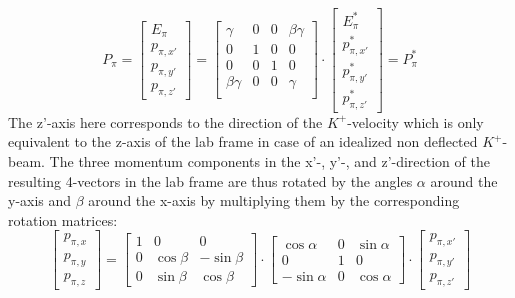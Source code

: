 \documentclass[a4paper,parskip,11pt, DIV12]{scrreprt}
\begin{document}
	\begin{equation}
		P_{\pi} = 
		\begin{bmatrix}
			E_{\pi} \\ p_{\pi,x'} \\ p_{\pi,y'} \\ p_{\pi,z'}
		\end{bmatrix}
		=
		\begin{bmatrix}
			\gamma & 0 & 0 & \beta \gamma \\
			0 & 1 & 0 & 0 \\
			0 & 0 & 1 & 0\\
			\beta \gamma & 0 & 0 & \gamma \\
		\end{bmatrix}
		\cdot
		\begin{bmatrix}
			E_{\pi}^* \\ p_{\pi,x'}^* \\ p_{\pi,y'}^* \\ p_{\pi,z'}^*
		\end{bmatrix} = P^*_{\pi}
	\end{equation}
	The z'-axis here corresponds to the direction of the $K^+$-velocity which is only equivalent to the z-axis of the lab frame in case of an idealized non deflected $K^+$-beam. The three momentum components in the x'-, y'-, and z'-direction of the resulting 4-vectors in the lab frame are thus rotated by the angles $\alpha$ around the y-axis and $\beta$ around the x-axis by multiplying them by the corresponding rotation matrices:
	\begin{equation}
		\begin{bmatrix}
			p_{\pi,x} \\ p_{\pi,y} \\ p_{\pi,z}
		\end{bmatrix}
		=
		\begin{bmatrix}
			1 &   0         & 0           \\
			0 & \cos \beta & -\sin \beta \\
			0 & \sin \beta &  \cos \beta
		\end{bmatrix}
		\cdot
		\begin{bmatrix}
			\cos \alpha  & 0 & \sin \alpha \\
			0         & 1 &  0          \\
			-\sin \alpha & 0 & \cos \alpha
		\end{bmatrix}
		\cdot
		\begin{bmatrix}
			p_{\pi,x'} \\ p_{\pi,y'} \\ p_{\pi,z'}
		\end{bmatrix}
	\end{equation}
	
\end{document}
